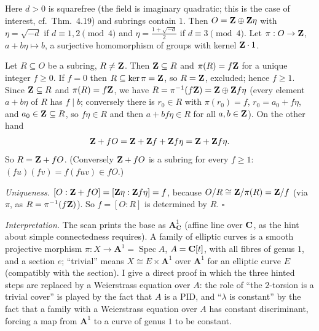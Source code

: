 \documentclass[11pt]{article}
\begin{document}
\pf
Here $d>0$ is squarefree (the field is imaginary quadratic; this is the case of interest, cf.\ Thm.~4.19) and subrings contain $1$. Then $O=\mathbf Z\oplus\mathbf Z\eta$ with $\eta=\sqrt{-d}$ if $d\equiv1,2\pmod4$ and $\eta=\frac{1+\sqrt{-d}}2$ if $d\equiv3\pmod4$. Let $\pi:O\to\mathbf Z$, $a+b\eta\mapsto b$, a surjective homomorphism of groups with kernel $\mathbf Z\cdot1$.

Let $R\subseteq O$ be a subring, $R\neq\mathbf Z$. Then $\mathbf Z\subseteq R$ and $\pi(R)=f\mathbf Z$ for a unique integer $f\ge0$. If $f=0$ then $R\subseteq\ker\pi=\mathbf Z$, so $R=\mathbf Z$, excluded; hence $f\ge1$. Since $\mathbf Z\subseteq R$ and $\pi(R)=f\mathbf Z$, we have $R=\pi^{-1}(f\mathbf Z)=\mathbf Z\oplus\mathbf Z f\eta$ (every element $a+b\eta$ of $R$ has $f\mid b$; conversely there is $r_0\in R$ with $\pi(r_0)=f$, $r_0=a_0+f\eta$, and $a_0\in\mathbf Z\subseteq R$, so $f\eta\in R$ and then $a+bf\eta\in R$ for all $a,b\in\mathbf Z$). On the other hand
\[
\mathbf Z+fO=\mathbf Z+\mathbf Z f+\mathbf Z f\eta=\mathbf Z+\mathbf Z f\eta .
\]
So $R=\mathbf Z+fO$. (Conversely $\mathbf Z+fO$ is a subring for every $f\ge1$: $(fu)(fv)=f(fuv)\in fO$.)

\emph{Uniqueness.} $[O:\mathbf Z+fO]=[\mathbf Z\eta:\mathbf Z f\eta]=f$, because $O/R\cong\mathbf Z/\pi(R)=\mathbf Z/f$ (via $\pi$, as $R=\pi^{-1}(f\mathbf Z)$). So $f=[O:R]$ is determined by $R$. \hfill$\square$

\pf
\emph{Interpretation.} The scan prints the base as $\mathbf A^1_{\mathbf C}$ (affine line over $\mathbf C$, as the hint about simple connectedness requires). A family of elliptic curves is a smooth projective morphism $\pi:X\to\mathbf A^1=\operatorname{Spec}A$, $A=\mathbf C[t]$, with all fibres of genus $1$, and a section $e$; ``trivial'' means $X\cong E\times\mathbf A^1$ over $\mathbf A^1$ for an elliptic curve $E$ (compatibly with the section). I give a direct proof in which the three hinted steps are replaced by a Weierstrass equation over $A$: the role of ``the $2$-torsion is a trivial cover'' is played by the fact that $A$ is a PID, and ``$\lambda$ is constant'' by the fact that a family with a Weierstrass equation over $A$ has constant discriminant, forcing a map from $\mathbf A^1$ to a curve of genus $1$ to be constant.
\end{document}
